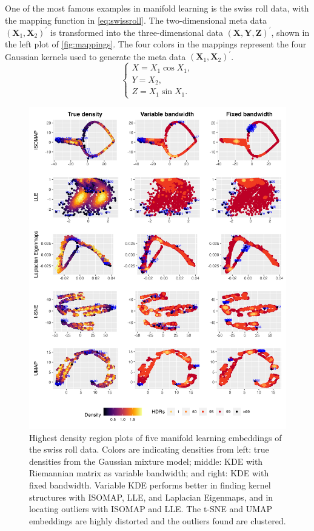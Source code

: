 \documentclass[11pt,a4paper,]{article}
\begin{document}
One of the most famous examples in manifold learning is the swiss roll data, with the mapping function in \autoref{eq:swissroll}. The two-dimensional meta data \((\pmb{X}_1, \pmb{X}_2)^\prime\) is transformed into the three-dimensional data \((\pmb{X}, \pmb{Y}, \pmb{Z})^\prime\), shown in the left plot of \autoref{fig:mappings}. The four colors in the mappings represent the four Gaussian kernels used to generate the meta data \((\pmb{X}_1, \pmb{X}_2)^\prime\).
\begin{equation}
\label{eq:swissroll}
\left\{
\begin{array}{lcl}
X = X_1 \cos{X_1}, \\
Y = X_2, \\
Z = X_1 \sin{X_1}.
\end{array}
\right.
\end{equation}

\begin{figure}

{\centering \includegraphics[width=0.95\linewidth]{figures/Swiss Roll_outliers_comparison_4ml_3cases_riem0_08} 

}

\caption{Highest density region plots of five manifold learning embeddings of the swiss roll data. Colors are indicating densities from left: true densities from the Gaussian mixture model; middle: KDE with Riemannian matrix as variable bandwidth; and right: KDE with fixed bandwidth. Variable KDE performs better in finding kernel structures with ISOMAP, LLE, and Laplacian Eigenmaps, and in locating outliers with ISOMAP and LLE. The t-SNE and UMAP embeddings are highly distorted and the outliers found are clustered.}\label{fig:sroutliers}
\end{figure}
\end{document}
